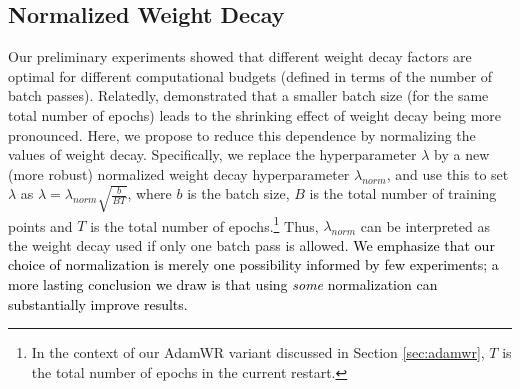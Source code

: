 \documentclass[usenames,dvipsnames]{article} %
\newcommand{\franknips}[1]{\textcolor{black}{#1}}
\begin{document}
\subsection{Normalized Weight Decay}
\label{sec:normw}
Our preliminary experiments showed that different weight decay factors are optimal for different computational budgets (defined in terms of the number of batch passes).
Relatedly, \citet{li2017visualizing} demonstrated that a smaller batch size (for the same total number of epochs) leads to the shrinking effect of weight decay being more pronounced.
Here, we propose to reduce this dependence by normalizing the values of weight decay. Specifically, we replace the hyperparameter $\lambda$ by a new (more robust) normalized weight decay hyperparameter $\lambda_{norm}$, and use this to set $\lambda$ 
as $\lambda = \lambda_{norm} \sqrt{ \frac{b}{B T} }$,	 
where $b$ is the batch size, $B$ is the total number of training points and $T$ is the total number of epochs.\footnote{In the context of our AdamWR variant discussed in Section \ref{sec:adamwr}, $T$ is the total number of epochs in the current restart.}
Thus, $\lambda_{norm}$ can be interpreted as the weight decay used if only one batch pass is allowed.
\franknips{We emphasize that our choice of normalization is merely one possibility informed by few experiments; a more lasting conclusion we draw is that using \emph{some} normalization can substantially improve results.}
%
\end{document}
